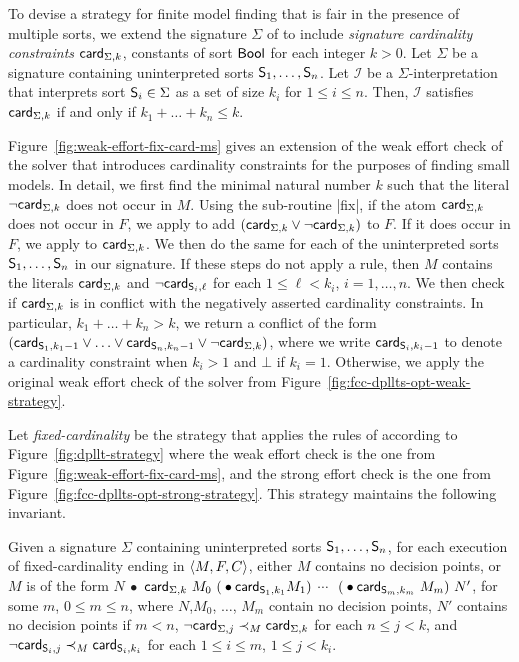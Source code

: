 \documentclass{svjour3}                     %
\begin{document}
To devise a strategy for finite model finding that is fair in the presence of multiple sorts,
we extend the signature $\Sigma$ of \fcc to include \emph{signature cardinality constraints} 
$\card[\Sigma, k]$, constants of sort $\bool$ for each integer $k > 0$.
Let $\Sigma$ be a signature containing uninterpreted sorts $\So_1, \ldots, \So_n$.
Let $\mathcal{I}$ be a $\Sigma$-interpretation that interprets sort $\So_i \in \Sigma$ as a set of size $k_i$ for $1 \leq i \leq n$.
Then, $\mathcal{I}$ satisfies $\card[\Sigma, k]$ if and only if $k_1 + \ldots + k_n \leq k$.

Figure~\ref{fig:weak-effort-fix-card-ms} gives an extension of the weak effort check of the \fcc solver
that introduces cardinality constraints for the purposes of finding small models.
In detail, we first find the minimal natural number $k$ such that the literal $\neg \card[\Sigma, k]$ does not occur in $M$.
Using the sub-routine |fix|, if the atom $\card[\Sigma, k]$ does not occur in $F$,
we apply  to add $( \card[\Sigma, k] \vee \neg \card[\Sigma, k] )$ to $F$.
If it does occur in $F$, we apply \decide to $\card[\Sigma, k]$.
We then do the same for each of the uninterpreted sorts $\So_1, \ldots, \So_n$ in our signature.
If these steps do not apply a rule,
then $M$ contains the literals $\card[ \Sigma, k ]$ 
and $\neg \card[ \So_i, \ell ]$ for each $1 \leq \ell < k_i$, $i = 1, \ldots, n$.
We then check if $\card[ \Sigma, k ]$ is in conflict with the negatively asserted cardinality constraints.
In particular, $k_1 + \ldots + k_n > k$, we return a conflict of the form 
$( \card[\So_1, k_1-1] \vee \ldots \vee \card[\So_n, k_n-1] \vee \neg \card[\Sigma, k] )$,
where we write $\card[\So_i, k_i-1]$ to denote a cardinality constraint when $k_i>1$ and $\bot$ if $k_i=1$.
Otherwise, we apply the original weak effort check of the \fcc solver from Figure~\ref{fig:fcc-dpllts-opt-weak-strategy}.

Let \emph{fixed-cardinality \checkfcc}
be the strategy that applies the rules of \dplltsfcconly according to Figure~\ref{fig:dpllt-strategy}
where the weak effort check is the one from Figure~\ref{fig:weak-effort-fix-card-ms},
and the strong effort check is the one from Figure~\ref{fig:fcc-dpllts-opt-strong-strategy}.
This strategy maintains the following invariant.

\begin{proposition}
\label{prop:fixed-card-dpllts}
Given a signature $\Sigma$ containing uninterpreted sorts $\So_1, \ldots, \So_n$,
for each execution of fixed-cardinality \checkfcc ending in $\state{M,F,C}$,
either $M$ contains no decision points, or $M$ is of the form 
$N \ \bullet$ $\card[\Sigma,k] \  M_0\ ({} \bullet \card[\So_1, k_1] M_1)$ $\cdots$ $\ ({} \bullet \card[\So_m, k_m] \  M_m) \ N'$,
for some $m$, $0 \leq m \leq n$, where $N$,$M_0$, $\ldots$, $M_m$ contain no decision points, 
$N'$ contains no decision points if $m \lt n$,
$\neg \card[\Sigma, j] \prec_M \card[\Sigma, k]$ for each $n \leq j \lt k$, 
and $\neg \card[\So_i, j] \prec_M \card[\So_i, k_i]$ for each $1 \leq i \leq m$, $1 \leq j \lt k_i$.
\end{proposition}
\end{document}
